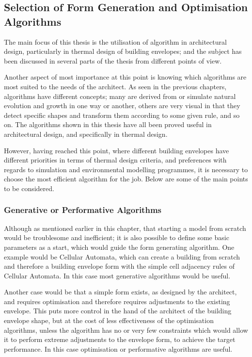 \subsection{Selection of Form Generation and Optimisation Algorithms}

The main focus of this thesis is the utilisation of algorithm in architectural design, particularly in thermal design of building envelopes; and the subject has been discussed in several parts of the thesis from different points of view.

Another aspect of most importance at this point is knowing which algorithms are most suited to the needs of the architect. As seen in the previous chapters, algorithms have different concepts; many are derived from or simulate natural evolution and growth in one way or another, others are very visual in that they detect specific shapes and transform them according to some given rule, and so on. The algorithms shown in this thesis have all been proved useful in architectural design, and specifically in thermal design.

However, having reached this point, where different building envelopes have different priorities in terms of thermal design criteria, and preferences with regards to simulation and environmental modelling programmes, it is necessary to choose the most efficient algorithm for the job. Below are some of the main points to be considered.

\subsubsection{Generative or Performative Algorithms}

Although as mentioned earlier in this chapter, that starting a model from scratch would be troublesome and inefficient; it is also possible to define some basic parameters as a start, which would guide the form generating algorithm. One example would be Cellular Automata, which can create a building from scratch and therefore a building envelope form with the simple cell adjacency rules of Cellular Automata. In this case most generative algorithms would be useful.

Another case would be that a simple form exists, as designed by the architect, and requires optimisation and therefore requires adjustments to the existing envelope. This puts more control in the hand of the architect of the building envelope shape, but at the cost of less effectiveness of the optimisation algorithms, unless the algorithm has no or very few constraints which would allow it to perform extreme adjustments to the envelope form, to achieve the target performance. In this case optimisation or performative algorithms are useful.

